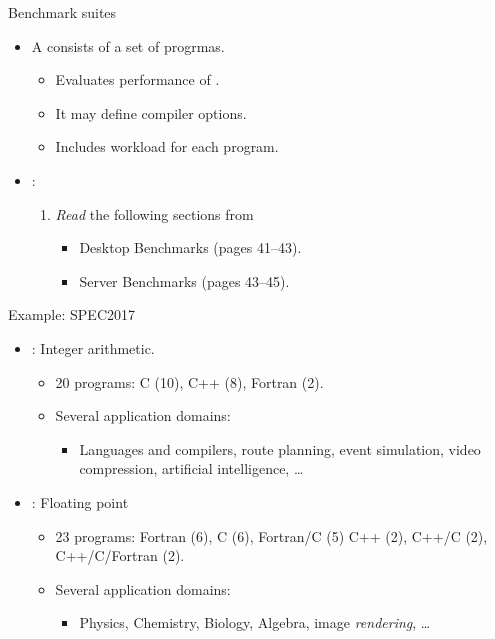 \begin{frame}[t]{Benchmark suites}
\begin{itemize}
  \item A  consists of a set of progrmas.
    \begin{itemize}
      \item Evaluates performance of .
      \item It may define compiler options.
      \item Includes workload for each program.
    \end{itemize}

  \item {}:
    \begin{enumerate}
      \item \emph{Read} the following sections from 

        \bibhennessy
        \begin{itemize}
          \item Desktop Benchmarks (pages 41--43).
          \item Server Benchmarks (pages 43--45).
        \end{itemize}
    \end{enumerate}
\end{itemize}
\end{frame}

\begin{frame}[t]{Example: SPEC2017}
\begin{itemize}
  \item {}: Integer arithmetic.
    \begin{itemize}
      \item 20 programs: C (10), C++ (8), Fortran (2).
      \item Several application domains:
        \begin{itemize}
          \item Languages and compilers, 
                route planning,
                event simulation,
                video compression, 
                artificial intelligence, \ldots
        \end{itemize}
    \end{itemize}

  \item {}: Floating point
    \begin{itemize}
      \item 23 programs:
           Fortran (6),
           C (6),
           Fortran/C (5)
           C++ (2),
           C++/C (2),
           C++/C/Fortran (2).
      \item Several application domains:
        \begin{itemize}
          \item Physics, Chemistry, Biology, Algebra, image \emph{rendering},
                \ldots
        \end{itemize}
    \end{itemize}
\end{itemize}
\end{frame}
